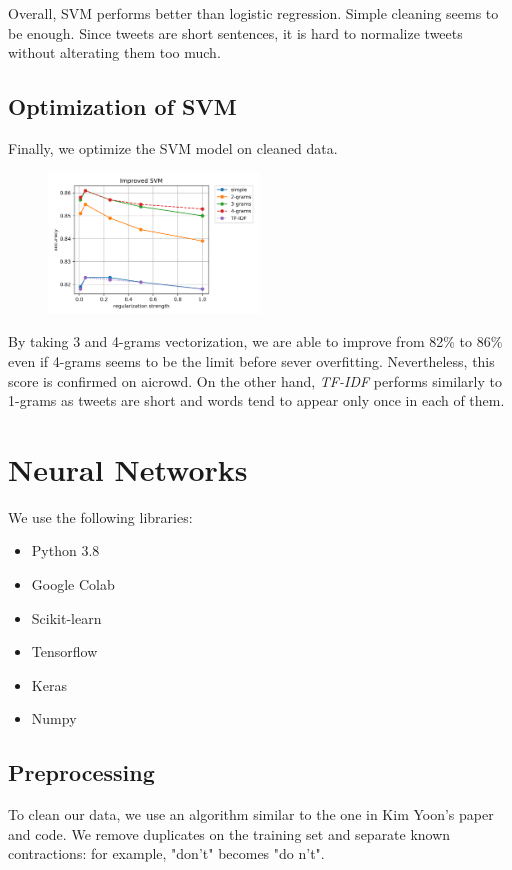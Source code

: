 \documentclass[11pt, a4paper, twocolumn]{article}
\begin{document}
Overall, SVM performs better than logistic regression. Simple cleaning seems to be enough. Since tweets are short sentences, it is hard to normalize tweets without alterating them too much.

\subsection{Optimization of SVM}
Finally, we optimize the SVM model on cleaned data.

\begin{figure}[h]
	\includegraphics[width=0.5\textwidth]{../plots/improved_svm.png}
\end{figure}

By taking 3 and 4-grams vectorization, we are able to improve from 82\% to 86\% even if 4-grams seems to be the limit before sever overfitting. Nevertheless, this score is confirmed on aicrowd. On the other hand, \textit{TF-IDF} performs similarly to 1-grams as tweets are short and words tend to appear only once in each of them.

\section{Neural Networks}
We use the following libraries:
\begin{itemize}
	\setlength\itemsep{1px}
	\item Python 3.8
	\item Google Colab
	\item Scikit-learn
	\item Tensorflow
	\item Keras
	\item Numpy
\end{itemize}
\subsection{Preprocessing}
To clean our data, we use an algorithm similar to the one in Kim Yoon's paper\cite{kimyoonpaper} and code\cite{kimyooncode}. We remove duplicates on the training set and separate known contractions: for example, "don't" becomes "do n't".
\end{document}
